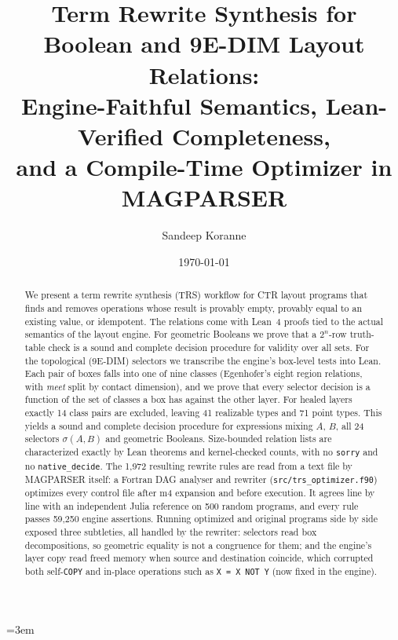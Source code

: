 \documentclass[11pt]{article}
\title{Term Rewrite Synthesis for Boolean and 9E-DIM Layout Relations:\\
Engine-Faithful Semantics, Lean-Verified Completeness,\\ and a Compile-Time Optimizer in MAGPARSER}
\author{Sandeep Koranne}
\date{\today}
\newcommand{\op}[1]{\texttt{#1}}
\begin{document}
\emergencystretch=3em
\maketitle

\begin{abstract}
We present a term rewrite synthesis (TRS) workflow for CTR layout programs that finds and removes operations whose result is provably empty, provably equal to an existing value, or idempotent. The relations come with Lean~4 proofs tied to the actual semantics of the layout engine. For geometric Booleans we prove that a $2^n$-row truth-table check is a sound and complete decision procedure for validity over all sets. For the topological (9E-DIM) selectors we transcribe the engine's box-level tests into Lean. Each pair of boxes falls into one of nine classes (Egenhofer's eight region relations, with \emph{meet} split by contact dimension), and we prove that every selector decision is a function of the set of classes a box has against the other layer. For healed layers exactly 14 class pairs are excluded, leaving 41 realizable types and 71 point types. This yields a sound and complete decision procedure for expressions mixing $A$, $B$, all 24 selectors $\sigma(A,B)$ and geometric Booleans. Size-bounded relation lists are characterized exactly by Lean theorems and kernel-checked counts, with no \texttt{sorry} and no \texttt{native\_decide}.
The 1{,}972 resulting rewrite rules are read from a text file by MAGPARSER itself: a Fortran DAG analyser and rewriter (\texttt{src/trs\_optimizer.f90}) optimizes every control file after m4 expansion and before execution. It agrees line by line with an independent Julia reference on 500 random programs, and every rule passes 59{,}250 engine assertions. Running optimized and original programs side by side exposed three subtleties, all handled by the rewriter: selectors read box decompositions, so geometric equality is not a congruence for them; and the engine's layer copy read freed memory when source and destination coincide, which corrupted both self-\op{COPY} and in-place operations such as \texttt{X = X NOT Y} (now fixed in the engine).
\end{abstract}
\end{document}
